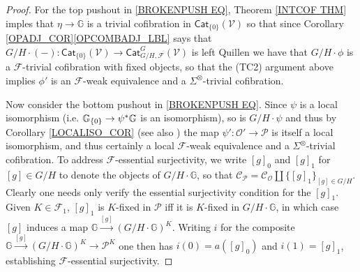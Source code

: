 \documentclass[a4paper,10pt
,draft
]{article}%
\numberwithin{equation}{section}
\numberwithin{figure}{section}
\theoremstyle{definition} %
\newcommand{\set}[1]{\left\{#1\right\}}%
\newcommand{\F}{\ensuremath{\mathcal F}}
\newcommand{\V}{\ensuremath{\mathcal V}}
\renewcommand{\O}{\ensuremath{\mathcal O}}
\renewcommand{\P}{\ensuremath{\mathcal P}}
\newcommand{\C}{\ensuremath{\mathcal C}}
\newcommand{\J}{\mathbb J}
\newcommand{\1}{\ensuremath{\mathbbm 1}}%
\begin{document}
\begin{proof}
      For the top pushout in \eqref{BROKENPUSH EQ}, Theorem \ref{INTCOF THM} imples that $\eta \to \mathbb{G}$
      is a trivial cofibration in $\mathsf{Cat}_{\{0\}}(\V)$
      so that since Corollary \ref{OPADJ_COR}\ref{OPCOMBADJ_LBL} %
      says that $G/H \cdot (-) \colon \mathsf{Cat}_{\{0\}}(\V) \to \mathsf{Cat}^G_{G/H,\F}(\V)$ is left Quillen
      we have that $G/H \cdot \phi$ is a $\F$-trivial cofibration with fixed objects,
      so that the (TC2) argument above implies $\phi'$ is
      an $\F$-weak equivalence and a $\Sigma^{\otimes}$-trivial cofibration.
      
      
      Now consider the bottom pushout in \eqref{BROKENPUSH EQ}.
      Since $\psi$ is a local isomorphism (i.e. $\mathbb{G}_{\{0\}} \to \psi^{\**}\mathbb{G}$ is an isomorphism),
      so is $G/H \cdot \psi$ and thus by Corollary \ref{LOCALISO_COR} (see also \cite[Prop. B.22]{Cav})
      the map $\psi' \colon \O' \to \mathcal{P}$
      is itself a local isomorphism, and thus certainly a local $\F$-weak equivalence and a $\Sigma^\otimes$-trivial cofibration.
To address $\F$-essential surjectivity, 
we write $[g]_0$ and $[g]_1$ for $[g] \in G/H$
to denote the objects of $G/H \cdot \mathbb{G}$,
so that $\C_{\P} = \C_{\O} \amalg \{[g]_1\}_{[g] \in G/H}$.
Clearly one needs only verify the essential surjectivity condition for the $[g]_1$.
Given $K\in \F_1$,
$[g]_1$ is $K$-fixed in $\P$ iff it is $K$-fixed in $G/H \cdot \mathbb{G}$,
in which case $[g]$ induces a map
$\mathbb{G} \xrightarrow{[g]} \left(G/H \cdot \mathbb{G}\right)^K$.
Writing $i$ for the composite 
$\mathbb{G} \xrightarrow{[g]} \left(G/H \cdot \mathbb{G}\right)^K \to \P^K$
one then has $i(0) = a([g]_0)$ and $i(1)=[g]_1$,
establishing $\F$-essential surjectivity.


\end{proof}
\end{document}
